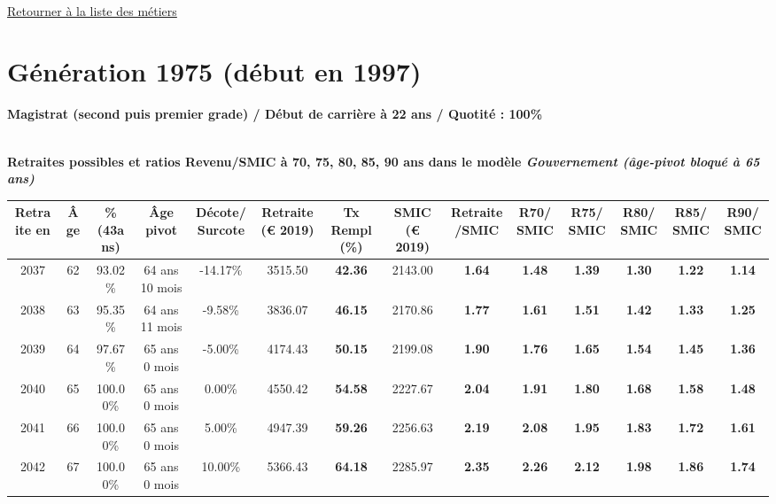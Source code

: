 ~\\ 
 
 \hyperlink{page.2}{\noindent Retourner à la liste des métiers}

 \newpage 

\section{Génération 1975 (début en 1997)\label{Magistrat_100_1975_22_0}} 
 
{\bf \noindent Magistrat (second puis premier grade) / Début de carrière à 22 ans / Quotité : 100\%}  ~ 

 ~\\{\bf \noindent Retraites possibles et ratios Revenu/SMIC à 70, 75, 80, 85, 90 ans dans le modèle \emph{Gouvernement (âge-pivot bloqué à 65 ans)}}  
 
\begin{adjustbox}{max width=\textwidth} 
\begin{tabular}[htb]{|c|c||c|c|c||c|c||c|c||c|c|c|c|c|} 
\hline 
 Retraite en &  Âge &  \%(43ans) &  Âge pivot &  Décote/Surcote &  Retraite (\euro{} 2019) &  Tx Rempl(\%) &  SMIC (\euro{} 2019) &  Retraite/SMIC &  R70/SMIC &  R75/SMIC &  R80/SMIC &  R85/SMIC &  R90/SMIC \\ 
\hline \hline 
 2037 &  62 &  93.02\% &  64 ans 10 mois &  -14.17\% &  3515.50 &  {\bf 42.36} &  2143.00 &  {\bf 1.64} &  {\bf 1.48} &  {\bf 1.39} &  {\bf 1.30} &  {\bf 1.22} &  {\bf 1.14} \\ 
\hline 
 2038 &  63 &  95.35\% &  64 ans 11 mois &  -9.58\% &  3836.07 &  {\bf 46.15} &  2170.86 &  {\bf 1.77} &  {\bf 1.61} &  {\bf 1.51} &  {\bf 1.42} &  {\bf 1.33} &  {\bf 1.25} \\ 
\hline 
 2039 &  64 &  97.67\% &  65 ans 0 mois &  -5.00\% &  4174.43 &  {\bf 50.15} &  2199.08 &  {\bf 1.90} &  {\bf 1.76} &  {\bf 1.65} &  {\bf 1.54} &  {\bf 1.45} &  {\bf 1.36} \\ 
\hline 
 2040 &  65 &  100.00\% &  65 ans 0 mois &  0.00\% &  4550.42 &  {\bf 54.58} &  2227.67 &  {\bf 2.04} &  {\bf 1.91} &  {\bf 1.80} &  {\bf 1.68} &  {\bf 1.58} &  {\bf 1.48} \\ 
\hline 
 2041 &  66 &  100.00\% &  65 ans 0 mois &  5.00\% &  4947.39 &  {\bf 59.26} &  2256.63 &  {\bf 2.19} &  {\bf 2.08} &  {\bf 1.95} &  {\bf 1.83} &  {\bf 1.72} &  {\bf 1.61} \\ 
\hline 
 2042 &  67 &  100.00\% &  65 ans 0 mois &  10.00\% &  5366.43 &  {\bf 64.18} &  2285.97 &  {\bf 2.35} &  {\bf 2.26} &  {\bf 2.12} &  {\bf 1.98} &  {\bf 1.86} &  {\bf 1.74} \\ 
\hline 
\hline 
\end{tabular} 
\end{adjustbox} 
 
